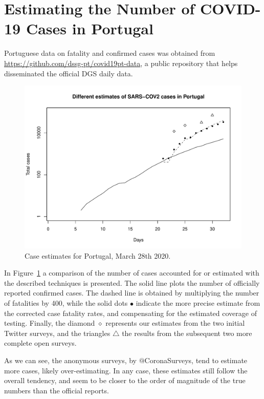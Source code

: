 \documentclass{article}
\begin{document}
\section{Estimating the Number of COVID-19 Cases in Portugal}

Portuguese data on fatality and confirmed cases was obtained from \url{https://github.com/dssg-pt/covid19pt-data}, a public repository that helps disseminated the official DGS daily data.

\begin{figure}
\begin{center}
\includegraphics[width=.9\linewidth]{EstPTMar28.pdf}
\end{center}
\caption{Case estimates for Portugal, March 28th 2020.}
\label{pt}
\end{figure}

In Figure~\ref{pt} a comparison of the number of cases accounted for or estimated with the described techniques is presented. The solid line plots the number of officially reported confirmed cases. The dashed line is obtained by multiplying the number of fatalities by 400, while the solid dots $\bullet$ indicate the more precise estimate from the corrected case fatality rates, and compensating for the estimated coverage of testing. Finally, the diamond $\diamond$ represents our estimates from the two initial Twitter surveys, and the triangles $\triangle$ the results from the subsequent two more complete open surveys. 

As we can see, the anonymous surveys, by $@$CoronaSurveys, tend to estimate more cases, likely over-estimating. In any case, these estimates still follow the overall tendency, and seem to be closer to the order of magnitude of the true numbers than the official reports. 
\end{document}
